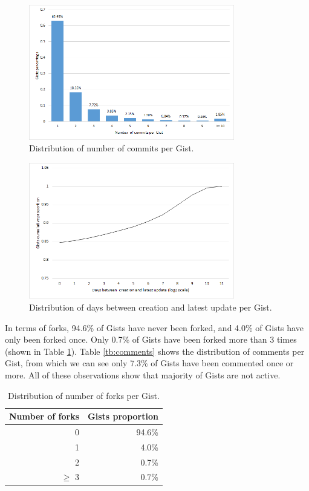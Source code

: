 \begin{figure}[!htb]
	\centering
	\includegraphics[width=0.8\textwidth]{figures/commits.png}
	\caption{Distribution of number of commits per Gist.}
	\label{fig:commits}
\end{figure}
\begin{figure}[!htb]
	\centering
	\includegraphics[width=0.8\textwidth]{figures/date_diff.png}
	\caption{Distribution of days between creation and latest update per Gist.}
	\label{fig:days}
\end{figure}

In terms of forks, 94.6\% of Gists have never been forked, and 4.0\% of Gists have only been forked once. Only 0.7\% of Gists have been forked more than 3 times (shown in Table \ref{tb:forks}). Table \ref{tb:comments} shows the distribution of comments per Gist, from which we can see only 7.3\% of Gists have been commented once or more. All of these observations show that majority of Gists are not active.

\begin{table}[!htb]
 \begin{center}
 \begin{tabular}{@{}rr} 
    \textbf{Number of forks} &   \textbf{Gists proportion}\\ \hline
    0 &   94.6\% \\ 
    1 &   4.0\% \\ 
    2 &   0.7\% \\ 
    $\geq$ 3 &   0.7\%\\ \hline
 \end{tabular}
 \end{center}
 \caption{Distribution of number of forks per Gist.}
 \label{tb:forks}
\end{table}

